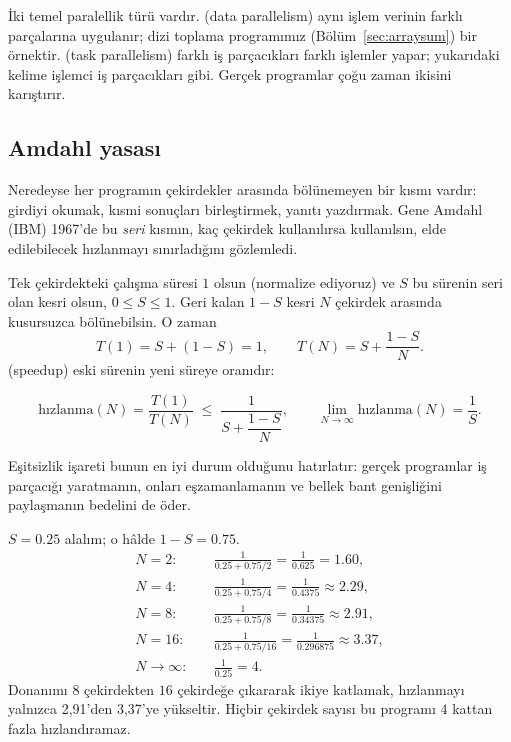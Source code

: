 İki temel paralellik türü vardır.  (data parallelism) aynı işlem verinin farklı parçalarına uygulanır; dizi toplama programımız (Bölüm~\ref{sec:arraysum}) bir örnektir.  (task parallelism) farklı iş parçacıkları farklı işlemler yapar; yukarıdaki kelime işlemci iş parçacıkları gibi. Gerçek programlar çoğu zaman ikisini karıştırır.

\subsection{Amdahl yasası}

Neredeyse her programın çekirdekler arasında bölünemeyen bir kısmı vardır: girdiyi okumak, kısmi sonuçları birleştirmek, yanıtı yazdırmak. Gene Amdahl (IBM) 1967'de bu \emph{seri} kısmın, kaç çekirdek kullanılırsa kullanılsın, elde edilebilecek hızlanmayı sınırladığını gözlemledi.

Tek çekirdekteki çalışma süresi $1$ olsun (normalize ediyoruz) ve $S$ bu sürenin seri olan kesri olsun, $0 \le S \le 1$. Geri kalan $1-S$ kesri $N$ çekirdek arasında kusursuzca bölünebilsin. O zaman
\[
T(1) = S + (1-S) = 1, \qquad T(N) = S + \frac{1-S}{N}.
\]
 (speedup) eski sürenin yeni süreye oranıdır:
\begin{keyidea}
\[
\text{hızlanma}(N) = \frac{T(1)}{T(N)} \;\le\; \frac{1}{S + \dfrac{1-S}{N}},
\qquad
\lim_{N\to\infty} \text{hızlanma}(N) = \frac{1}{S}.
\]
\end{keyidea}
Eşitsizlik işareti bunun en iyi durum olduğunu hatırlatır: gerçek programlar iş parçacığı yaratmanın, onları eşzamanlamanın ve bellek bant genişliğini paylaşmanın bedelini de öder.

\begin{example}
$S = 0.25$ alalım; o hâlde $1-S = 0.75$.
\begin{align*}
N=2:&\quad \frac{1}{0.25 + 0.75/2} = \frac{1}{0.625} = 1.60,\\
N=4:&\quad \frac{1}{0.25 + 0.75/4} = \frac{1}{0.4375} \approx 2.29,\\
N=8:&\quad \frac{1}{0.25 + 0.75/8} = \frac{1}{0.34375} \approx 2.91,\\
N=16:&\quad \frac{1}{0.25 + 0.75/16} = \frac{1}{0.296875} \approx 3.37,\\
N\to\infty:&\quad \frac{1}{0.25} = 4.
\end{align*}
Donanımı $8$ çekirdekten $16$ çekirdeğe çıkararak ikiye katlamak, hızlanmayı yalnızca 2,91'den 3,37'ye yükseltir. Hiçbir çekirdek sayısı bu programı $4$ kattan fazla hızlandıramaz.
\end{example}

